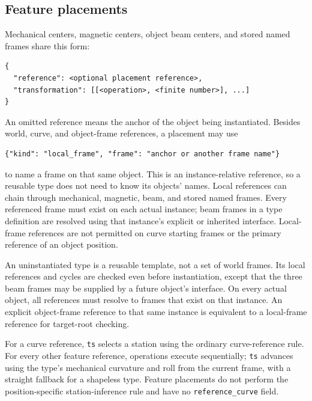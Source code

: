 \documentclass[11pt,a4paper]{article}
\begin{document}
\subsection{Feature placements}

Mechanical centers, magnetic centers, object beam centers, and stored named
frames share this form:
\begin{lstlisting}
{
  "reference": <optional placement reference>,
  "transformation": [[<operation>, <finite number>], ...]
}
\end{lstlisting}
An omitted reference means the anchor of the object being instantiated.
Besides world, curve, and object-frame references, a placement may use
\begin{lstlisting}
{"kind": "local_frame", "frame": "anchor or another frame name"}
\end{lstlisting}
to name a frame on that same object. This is an instance-relative reference,
so a reusable type does not need to know its objects' names. Local references
can chain through mechanical, magnetic, beam, and stored named frames.
Every referenced frame must exist on each actual instance; beam frames in a
type definition are resolved using that instance's explicit or inherited
interface. Local-frame references are not permitted on curve starting frames
or the primary reference of an object position.

An uninstantiated type is a reusable template, not a set of world frames.
Its local references and cycles are checked even before instantiation, except
that the three beam frames may be supplied by a future object's interface.
On every actual object, all references must resolve to frames that exist on
that instance. An explicit object-frame reference to that same instance is
equivalent to a local-frame reference for target-root checking.

For a curve reference, \texttt{ts} selects a station using the ordinary
curve-reference rule. For every other feature reference, operations execute
sequentially; \texttt{ts} advances using the type's mechanical curvature and
roll from the current frame, with a straight fallback for a shapeless type.
Feature placements do not perform the position-specific station-inference
rule and have no \texttt{reference\_curve} field.
\end{document}
